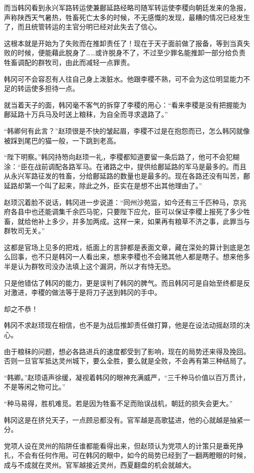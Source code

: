 而当韩冈看到永兴军路转运使兼鄜延路经略司随军转运使李稷向朝廷发来的急报，声称陕西天气暑热，牲畜死亡太多的时候，不无感慨的发现，最糟的情况已经发生了，而且统管转运的主官分明已经对此失去了信心。

这根本就是开始为了失败而在推卸责任了！现在于天子面前做了报备，等到当真失败的时候，便能藉此脱身了……或许脱身不了，不过至少罪名能推卸一部分给负责牲畜调配的群牧司，由此而减轻一点罪责。

韩冈可不会容忍有人往自己身上泼脏水。他跟李稷不熟，可不会为这位明显能力不足的转运使多担待一点。

就当着天子的面，韩冈毫不客气的拆穿了李稷的用心：“看来李稷是没有把握能为鄜延路十万兵马及时送上粮秣，为自全而寻求退路了。”

“韩卿何有此言？”赵顼很是不快的皱起眉，李稷不过是在抱怨而已，怎么韩冈就像被踩到尾巴的猫一般，一下跳到老高。

“陛下明察。”韩冈持笏向赵顼一礼，李稷都知道要留一条后路了，他可不会犯糊涂：“臣在战前调配各路军马。在诸路之中，提供给鄜延路的军马是最多的。而且从永兴军路征发的牲畜，分给鄜延路的数量也是最多的。现在各路还没有叫苦，鄜延路却第一个叫了起来，除此之外，臣实在是想不出其他理由了。”

赵顼沉着脸不说话，韩冈进一步说道：“同州沙苑监，如今还有三千匹种马，京兆府各县中也还能调集千余匹马驼，只要陛下应允，臣可以保证李稷上报死了多少牲畜，就给他补上多少，并多加两成。这样一来，如果再有粮草不济之事，此罪当与群牧司无关。”

这都是官场上见多的把戏，纸面上的言辞都是表面文章，藏在深处的算计到底是怎么回事，也不只是韩冈一人看出来，想来李稷也不会赌其他人都是瞎子。想来他多半是认为群牧司没办法填上这个漏洞，所以才有恃无恐。

只是他错估了韩冈的能力，更是误判了韩冈的脾气。而且韩冈可是自始至终都是反对激进，李稷的做法等于是将刀子送到韩冈的手中。

却之不恭！

韩冈不求赵顼现在相信，也不是为战后推卸责任做打算，他是在设法动摇赵顼的决心。

由于粮秣的问题，想必各路进兵的速度都受到了影响，现在的局势还来得及挽回。否则一旦官军抵达灵州城下，要么全胜，要么就是全败，不会再有第三种结局了。

“韩卿。”赵顼语声徐缓，凝视着韩冈的眼神充满威严，“三千种马价值以百万贯计，不是等闲之物可比。”

“种马易得，胜机难觅。若是因为牲畜不足而贻误战机，朝廷的损失会更大。”

韩冈这是在挤兑天子，一点顾忌都没有。官军越是高歌猛进，他的心就越是抽紧一分。

党项人设在灵州的陷阱任谁都能看得出来，但赵顼认为党项人的计策只是垂死挣扎，不会有任何作用。可在韩冈的眼中，如今的局势已经到了一翻两瞪眼的时候，成与不成就在灵州。官军越接近灵州，西夏翻盘的机会就越大。

